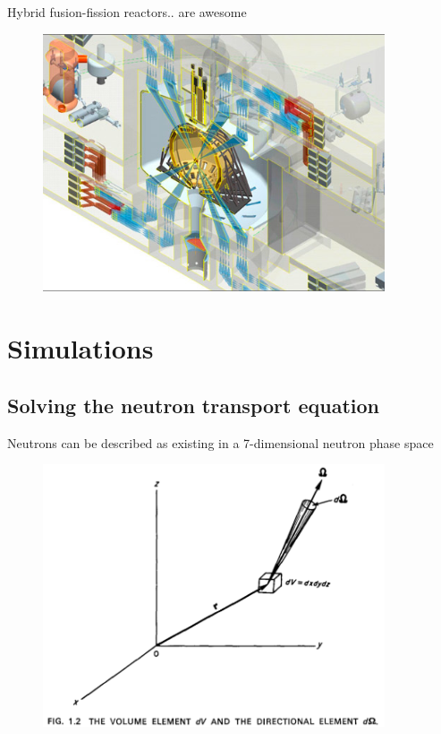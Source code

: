 \documentclass{beamer}
\begin{document}
        \begin{frame}{Hybrid fusion-fission reactors}{.. are awesome}
            \begin{figure}
                \centering
                \includegraphics[width=0.9\textwidth]{./img/lifeChamber.png}
                \caption*{}
            \end{figure}
        \end{frame}

\section{Simulations}

    \subsection{Solving the neutron transport equation}

        \begin{frame}{Neutrons can be described as existing in a 7-dimensional neutron phase space}
            \begin{figure}
                \centering
                \includegraphics[width=0.9\textwidth]{./img/phaseSpace.png}
            \end{figure}
        \end{frame}
\end{document}
